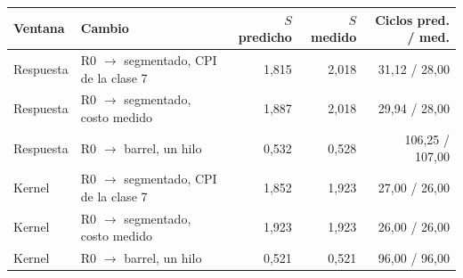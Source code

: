 \begin{tabular}{llrrr}
\toprule
Ventana & Cambio & $S$ predicho & $S$ medido & Ciclos pred. / med. \\
\midrule
Respuesta & R0 $\to$ segmentado, CPI de la clase 7 & 1{,}815 & 2{,}018 & 31{,}12 / 28{,}00 \\
Respuesta & R0 $\to$ segmentado, costo medido & 1{,}887 & 2{,}018 & 29{,}94 / 28{,}00 \\
Respuesta & R0 $\to$ barrel, un hilo & 0{,}532 & 0{,}528 & 106{,}25 / 107{,}00 \\
Kernel & R0 $\to$ segmentado, CPI de la clase 7 & 1{,}852 & 1{,}923 & 27{,}00 / 26{,}00 \\
Kernel & R0 $\to$ segmentado, costo medido & 1{,}923 & 1{,}923 & 26{,}00 / 26{,}00 \\
Kernel & R0 $\to$ barrel, un hilo & 0{,}521 & 0{,}521 & 96{,}00 / 96{,}00 \\
\bottomrule
\end{tabular}
\par{}
